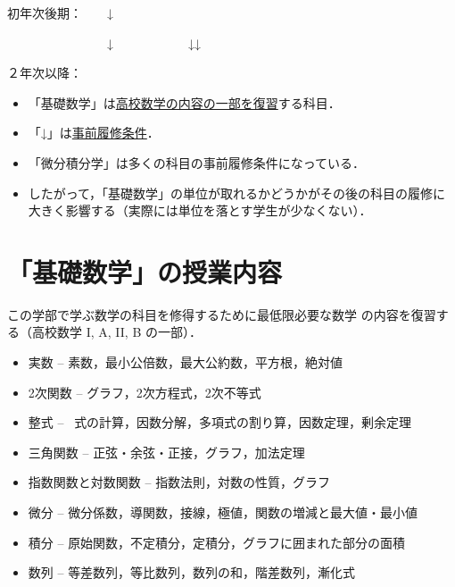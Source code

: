 \documentclass[a4j,landscape,25pt]{jsarticle}
\begin{document}
初年次後期：\hspace{5pt}\quad　　↓　　　\quad{}

　　　　　　　　↓　　　　　　\hspace{3.5pt}↓\hspace{104pt}↓

２年次以降：\quad{}\quad{}\quad{}\quad{}\hspace{31pt}

\bigskip

\begin{itemize}
\item 「基礎数学」は\underline{高校数学の内容の一部を復習}する科目．
\item 「↓」は\underline{事前履修条件}．
\item 「微分積分学」は多くの科目の事前履修条件になっている．
\item したがって，「基礎数学」の単位が取れるかどうかがその後の科目の履修に大きく影響する（実際には単位を落とす学生が少なくない）．

\end{itemize}

\section{「基礎数学」の授業内容}
この学部で学ぶ数学の科目を修得するために最低限必要な数学
の内容を復習する（高校数学 I, A, II, B の一部）．

\begin{itemize}
\item 実数 --
{\footnotesize 素数，最小公倍数，最大公約数，平方根，絶対値}\vspace{2pt}
\item 2次関数 --
{\footnotesize グラフ，2次方程式，2次不等式}\vspace{2pt}
\item 整式 -- \
{\footnotesize 式の計算，因数分解，多項式の割り算，因数定理，剰余定理}\vspace{2pt}
\item 三角関数 --
{\footnotesize 正弦・余弦・正接，グラフ，加法定理}\vspace{2pt}
\item 指数関数と対数関数 --
{\footnotesize 指数法則，対数の性質，グラフ}\vspace{2pt}
\item 微分 --
{\footnotesize 微分係数，導関数，接線，極値，関数の増減と最大値・最小値}\vspace{2pt}
\item 積分 --
{\footnotesize 原始関数，不定積分，定積分，グラフに囲まれた部分の面積}\vspace{2pt}
\item 数列 --
{\footnotesize 等差数列，等比数列，数列の和，階差数列，漸化式}
\end{itemize}
\end{document}

